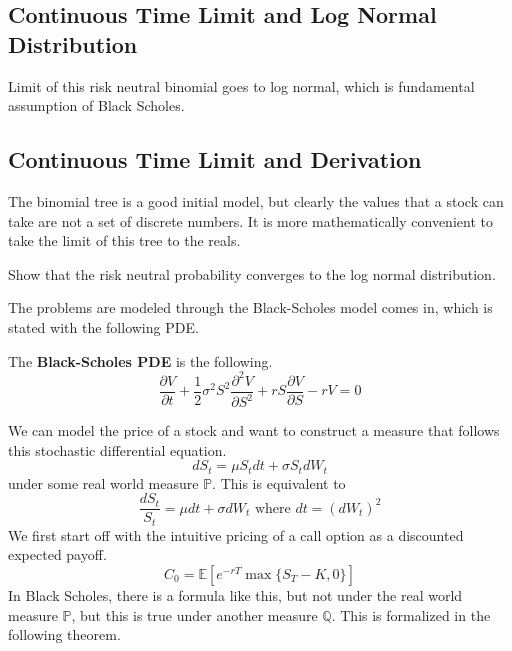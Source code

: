 \documentclass{article}
\begin{document}
  \subsection{Continuous Time Limit and Log Normal Distribution}

    Limit of this risk neutral binomial goes to log normal, which is fundamental assumption of Black Scholes. 

  \subsection{Continuous Time Limit and Derivation}

    The binomial tree is a good initial model, but clearly the values that a stock can take are not a set of discrete numbers. It is more mathematically convenient to take the limit of this tree to the reals. 

    \begin{question}[TBD]
      Show that the risk neutral probability converges to the log normal distribution. 
    \end{question}

    The problems are modeled through the Black-Scholes model comes in, which is stated with the following PDE.

    \begin{definition}
      The \textbf{Black-Scholes PDE} is the following. 
      \begin{equation}
        \frac{\partial V}{\partial t} + \frac{1}{2} \sigma^2 S^2 \frac{\partial^2 V}{\partial S^2} + r S \frac{\partial V}{\partial S} - rV = 0
      \end{equation}
    \end{definition}

    We can model the price of a stock and want to construct a measure that follows this stochastic differential equation. 
    \begin{equation}
      dS_t = \mu S_t dt + \sigma S_t dW_t
    \end{equation}
    under some real world measure $\mathbb{P}$. This is equivalent to 
    \begin{equation}
      \frac{d S_t}{S_t} = \mu dt + \sigma d W_t \text{ where } dt = (dW_t)^2
    \end{equation}
    We first start off with the intuitive pricing of a call option as a discounted expected payoff. 
    \begin{equation}
      C_0 = \mathbb{E} [ e^{-r T} \max\{ S_T - K, 0\}]
    \end{equation}
    In Black Scholes, there is a formula like this, but not under the real world measure $\mathbb{P}$, but this is true under another measure $\mathbb{Q}$.  This is formalized in the following theorem. 
\end{document}
